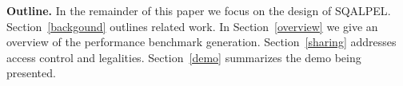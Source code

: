 \documentclass{cidr-2019}
\begin{document}



 

{\bf Outline.} In the remainder of this paper we focus on the design
of {\sc SQALPEL}. Section~\ref{backgound} outlines related work. In
Section~\ref{overview} we give an overview of the performance
benchmark generation. Section~\ref{sharing} addresses access control
and legalities. Section~\ref{demo} summarizes the demo being
presented.
\end{document}
